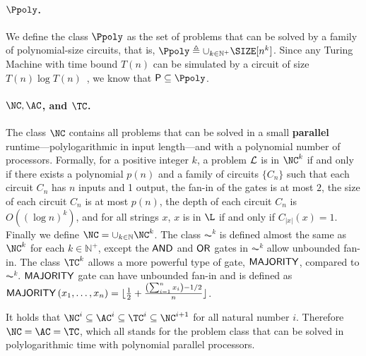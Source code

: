 \paragraph{$\Ppoly$.} We define the class $\Ppoly$ as the set of problems that can be solved by a family of polynomial-size circuits, that is, $\Ppoly\triangleq \cup_{k\in\mathbb{N}^+} \SIZE[n^k]$. Since any Turing Machine with time bound $T(n)$ can be simulated by a circuit of size $T(n)\log T(n)$~\citep{pippenger1979relations}, we know that $\P\subseteq \Ppoly$. 


\paragraph{$\NC,\AC$, and $\TC$.} The class $\NC$ contains all problems that can be solved in a small \textbf{parallel} runtime---polylogarithmic in input length---and with a polynomial number of processors. Formally, for a positive integer $k$,  a problem ${\mathcal{L}}$ is in $\NC^k$ if and only if there exists a polynomial $p(n)$ and a  family of circuits $\{C_n\}$ such that each circuit $C_n$ has $n$ inputs and 1 output, the fan-in of the gates is at most $2$, the size of each circuit $C_n$ is at most $p(n)$, the depth of each circuit $C_n$ is $O((\log n)^k)$, and for all strings $x$, $x$ is in $\L$ if and only if $C_{|x|}(x) = 1$. Finally we define $\NC=\cup_{k\in\mathbb{N}} \NC^k$.
The class $\AC^k$ is defined almost the same as $\NC^k$ for each $k\in\mathbb{N}^+$, except the $\mathsf{AND}$ and $\mathsf{OR}$ gates in $\AC^k$ allow unbounded fan-in. 
The class $\TC^k$ allows a more powerful type of gate, $\mathsf{MAJORITY}$, compared to $\AC^k$. $\mathsf{MAJORITY}$ gate can have unbounded fan-in and is defined as 
	$\mathsf{MAJORITY}\left(x_{1},\dots ,x_{n}\right)=\lfloor {\frac {1}{2}}+{\frac {\left(\sum _{i=1}^{n}x_{i}\right)-1/2}{n}}\rfloor $.




It holds that $\NC^i\subseteq \AC^i\subseteq \TC^i\subseteq \NC^{i+1}$ for all natural number $i$. Therefore $\NC=\AC=\TC$, which all stands for the problem class that can be solved in polylogarithmic time with polynomial parallel processors.
